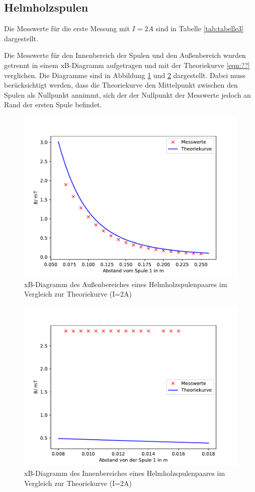 \subsection{Helmholzspulen}
\noindent Die Messwerte für die erste Messung mit $I=2A$
sind in Tabelle \ref{tab:tabelle3} dargestellt.

Die Messwerte für den Innenbereich der Spulen und den
Außenbereich wurden getrennt in einem xB-Diagramm
aufgetragen und mit der Theoriekurve \ref{eqn:??}
verglichen. Die Diagramme sind in Abbildung
\ref{fig:Helmholz1} und \ref{fig:Helmholz1I}
dargestellt. Dabei muss berücksichtigt werden, dass die
Theoriekurve den Mittelpunkt zwischen den Spulen als
Nullpunkt annimmt, sich der der Nullpunkt der
Messwerte jedoch an Rand der ersten Spule befindet.
\begin{figure}[H]
  \centering
  \includegraphics{Helmholz1.pdf}
  \caption{xB-Diagramm des Außenbereiches eines
  Helmholzspulenpaares im Vergleich zur Theoriekurve
  (I=2A)}
  \label{fig:Helmholz1}
\end{figure}
\begin{figure}[H]
  \centering
  \includegraphics{Helmholz1I.pdf}
  \caption{xB-Diagramm des Innenbereiches eines
  Helmholzspulenpaares im Vergleich zur Theoriekurve
  (I=2A)}
  \label{fig:Helmholz1I}
\end{figure}

